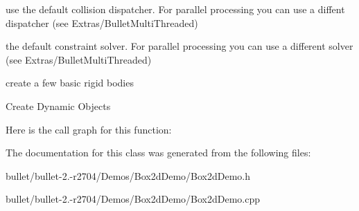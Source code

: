 use the default collision dispatcher. For parallel processing you can use a diffent dispatcher (see Extras/\+Bullet\+Multi\+Threaded)

the default constraint solver. For parallel processing you can use a different solver (see Extras/\+Bullet\+Multi\+Threaded)

create a few basic rigid bodies

Create Dynamic Objects 

Here is the call graph for this function\+:




The documentation for this class was generated from the following files\+:\begin{DoxyCompactItemize}
\item 
bullet/bullet-\/2.-\/r2704/\+Demos/\+Box2d\+Demo/Box2d\+Demo.\+h\item 
bullet/bullet-\/2.-\/r2704/\+Demos/\+Box2d\+Demo/Box2d\+Demo.\+cpp\end{DoxyCompactItemize}
